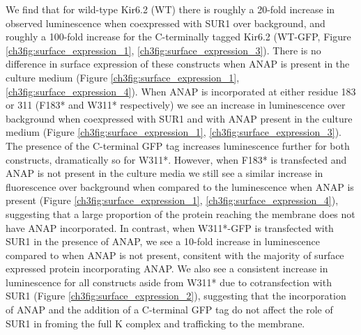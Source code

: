 We find that for wild-type Kir6.2 (WT) there is roughly a 20-fold increase in observed luminescence when coexpressed with SUR1 over background, and roughly a 100-fold increase for the C-terminally tagged Kir6.2 (WT-GFP, Figure \ref{ch3fig:surface_expression_1}, \ref{ch3fig:surface_expression_3}).
There is no difference in surface expression of these constructs when ANAP is present in the culture medium (Figure \ref{ch3fig:surface_expression_1}, \ref{ch3fig:surface_expression_4}).
When ANAP is incorporated at either residue 183 or 311 (F183* and W311* respectively) we see an increase in luminescence over background when coexpressed with SUR1 and with ANAP present in the culture medium (Figure \ref{ch3fig:surface_expression_1}, \ref{ch3fig:surface_expression_3}).
The presence of the C-terminal GFP tag increases luminescence further for both constructs, dramatically so for W311*.
However, when F183* is transfected and ANAP is not present in the culture media we still see a similar increase in fluorescence over background when compared to the luminescence when ANAP is present (Figure \ref{ch3fig:surface_expression_1}, \ref{ch3fig:surface_expression_4}), suggesting that a large proportion of the protein reaching the membrane does not have ANAP incorporated.
In contrast, when W311*-GFP is transfected with SUR1 in the presence of ANAP, we see a 10-fold increase in luminescence compared to when ANAP is not present, consitent with the majority of surface expressed protein incorporating ANAP.
We also see a consistent increase in luminescence for all constructs aside from W311* due to cotransfection with SUR1 (Figure \ref{ch3fig:surface_expression_2}), suggesting that the incorporation of ANAP and the addition of a C-terminal GFP tag do not affect the role of SUR1 in froming the full K\ATP{} complex and trafficking to the membrane.

